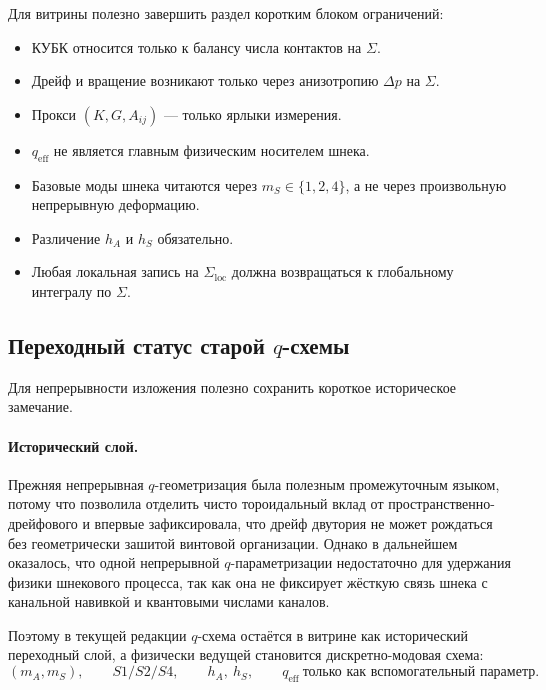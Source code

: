 Для витрины полезно завершить раздел коротким блоком ограничений:

\begin{itemize}
\item КУБК относится только к балансу числа контактов на \(\Sigma\).
\item Дрейф и вращение возникают только через анизотропию \(\Delta p\) на \(\Sigma\).
\item Прокси \((K,G,A_{ij})\) --- только ярлыки измерения.
\item \(q_{\mathrm{eff}}\) не является главным физическим носителем шнека.
\item Базовые моды шнека читаются через \(m_S\in\{1,2,4\}\), а не через произвольную непрерывную деформацию.
\item Различение \(h_A\) и \(h_S\) обязательно.
\item Любая локальная запись на \(\Sigma_{\mathrm{loc}}\) должна возвращаться к глобальному интегралу по \(\Sigma\).
\end{itemize}

\subsection{Переходный статус старой \(q\)-схемы}

Для непрерывности изложения полезно сохранить короткое историческое замечание.

\paragraph{Исторический слой.}
Прежняя непрерывная \(q\)-геометризация была полезным промежуточным языком, потому что позволила отделить чисто тороидальный вклад от пространственно-дрейфового и впервые зафиксировала, что дрейф двутория не может рождаться без геометрически зашитой винтовой организации. Однако в дальнейшем оказалось, что одной непрерывной \(q\)-параметризации недостаточно для удержания физики шнекового процесса, так как она не фиксирует жёсткую связь шнека с канальной навивкой и квантовыми числами каналов.

Поэтому в текущей редакции \(q\)-схема остаётся в витрине как исторический переходный слой, а физически ведущей становится дискретно-модовая схема:
\[
(m_A,m_S),\qquad S1/S2/S4,\qquad h_A,\ h_S,\qquad q_{\mathrm{eff}}\ \text{только как вспомогательный параметр.}
\]

